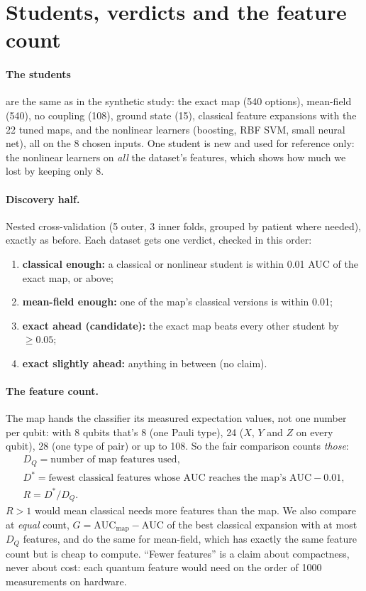\documentclass[11pt]{article}
\begin{document}
\section{Students, verdicts and the feature count}

\paragraph{The students} are the same as in the synthetic study: the exact map (540 options), mean-field
(540), no coupling (108), ground state (15), classical feature expansions with the 22 tuned maps, and the
nonlinear learners (boosting, RBF SVM, small neural net), all on the 8 chosen inputs. One student is new and
used for reference only: the nonlinear learners on \emph{all} the dataset's features, which shows how much
we lost by keeping only 8.

\paragraph{Discovery half.} Nested cross-validation (5 outer, 3 inner folds, grouped by patient where needed),
exactly as before. Each dataset gets one verdict, checked in this order:
\begin{enumerate}\setlength{\itemsep}{1pt}
\item \textbf{classical enough:} a classical or nonlinear student is within 0.01 AUC of the exact map, or above;
\item \textbf{mean-field enough:} one of the map's classical versions is within 0.01;
\item \textbf{exact ahead (candidate):} the exact map beats every other student by $\ge0.05$;
\item \textbf{exact slightly ahead:} anything in between (no claim).
\end{enumerate}

\paragraph{The feature count.}\label{sec:count} The map hands the classifier its measured expectation values,
not one number per qubit: with 8 qubits that's 8 (one Pauli type), 24 ($X$, $Y$ and $Z$ on every qubit), 28
(one type of pair) or up to 108. So the fair comparison counts \emph{those}:
\begin{gather}
D_Q=\text{number of map features used},\nonumber\\
D^\ast=\text{fewest classical features whose AUC reaches the map's AUC}-0.01,\nonumber\\
R=D^\ast/D_Q .
\end{gather}
$R>1$ would mean classical needs more features than the map. We also compare at \emph{equal} count,
$G=\mathrm{AUC}_{\text{map}}-\mathrm{AUC}$ of the best classical expansion with at most $D_Q$ features, and
do the same for mean-field, which has exactly the same feature count but is cheap to compute. ``Fewer
features'' is a claim about compactness, never about cost: each quantum feature would need on the order of
1000 measurements on hardware.
\end{document}
